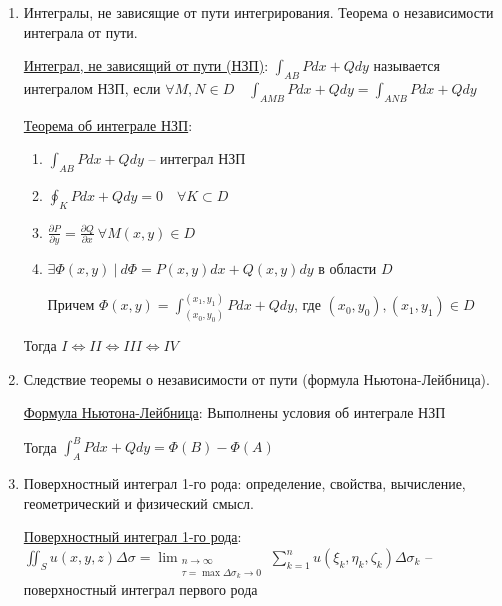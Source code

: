 \documentclass[12pt]{article}
\begin{document}
\begin{enumerate}
        \item Интегралы, не зависящие от пути интегрирования. Теорема о независимости интеграла от пути.

        \hyperlink{pathindependentintegrals}{Интеграл, не зависящий от пути (НЗП)}: $\int_{AB}Pdx + Qdy$ называется интегралом НЗП, если $\forall M, N \in D \quad \int_{AMB}Pdx + Qdy = \int_{ANB}Pdx + Qdy$

        \hyperlink{theorempathindependentintegrals}{Теорема об интеграле НЗП}:

        \begin{enumerate}[label=\Roman*.]

        \item $\int_{AB} Pdx + Qdy$ -- интеграл НЗП

        \item $\oint_K Pdx + Qdy = 0 \quad \forall K \subset D$

        \item $\frac{\partial P}{\partial y} = \frac{\partial Q}{\partial x} \ \forall M(x, y) \in D$

        \item $\exists \Phi(x, y) \ | \ d\Phi = P(x, y)dx + Q(x, y)dy$ в области $D$

        Причем $\Phi(x, y) = \int_{(x_0,y_0)}^{(x_1,y_1)}Pdx+Qdy$, где $(x_0, y_0), (x_1,y_1) \in D$

        \end{enumerate}

        Тогда $I \Longleftrightarrow II \Longleftrightarrow III \Longleftrightarrow IV$

        \item Следствие теоремы о независимости от пути (формула Ньютона-Лейбница).

        \hyperlink{theoremNewtonLeibnizforpathindependantintegral}{Формула Ньютона-Лейбница}:
        Выполнены условия \Ths об интеграле НЗП

        Тогда $\int_A^B Pdx + Qdy = \Phi(B) - \Phi(A)$

        \item Поверхностный интеграл 1-го рода: определение, свойства, вычисление, геометрический и физический смысл.

        \hyperlink{surfaceintegraloffirstkind}{Поверхностный интеграл 1-го рода}:
        $\iint_S u(x, y, z) \Delta \sigma = \lim_{\substack{n \to \infty \\ \tau = \max \Delta \sigma_k \to 0}} \sum_{k = 1}^{n} u(\xi_k, \eta_k, \zeta_k) \Delta \sigma_k$ -- поверхностный интеграл первого рода


\end{enumerate}
\end{document}
